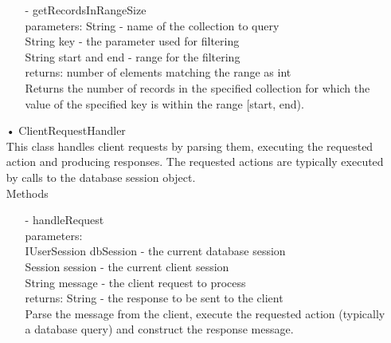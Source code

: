 \documentclass[oneside, english, final]{design}
\begin{document}
\begin{itemize}
\begin{itemize}
		      \item[-]getRecordsInRangeSize
		            \\parameters: String - name of the collection to query
		            \\String key - the parameter used for filtering
		            \\String start and end - range for the filtering
		            \\returns: number of elements matching the range as int
		            \\Returns the number of records in the specified
		            collection for which the value of the specified
		            key is within the range [start, end).

	      \end{itemize}

	      \newpage

	\item[•]ClientRequestHandler
	      \\This class handles client requests by parsing them, executing
	      the requested action and producing responses.
	      The requested actions are typically executed by calls to the database session object.
	      \\Methods
	      \begin{itemize}
		      \item[-]handleRequest
		            \\parameters: \\IUserSession  dbSession - the current database session
		            \\Session session - the current client session
		            \\String message - the client request to process
		            \\returns: String - the response to be sent to the client
		            \\Parse the message from the client, execute the requested action (typically a database query)  and construct the response message.
	      \end{itemize}


\end{itemize}
\end{document}
